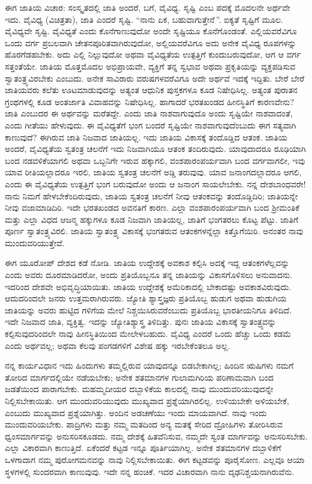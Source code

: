 ಈಗ ಜಾತಿಯ ವಿಚಾರ: ಸಂಸ್ಕೃತದಲ್ಲಿ ಜಾತಿ ಅಂದರೆ, ಬಗೆ, ವೈವಿಧ್ಯ. ಸೃಷ್ಟಿ ಎಂಬ ಪದಕ್ಕೆ ಮೊದಲನೇ ಅರ್ಥವೇ ಇದು. ವೈವಿಧ್ಯ (ವಿಚಿತ್ರತಾ), ಜಾತಿ ಎಂದರೆ ಸೃಷ್ಟಿ. “ನಾನು ಏಕ, ಬಹುವಾಗುತ್ತೇನೆ\,”. ಐಕ್ಯತೆ ಸೃಷ್ಟಿಗೆ ಮೂಲ. ವೈವಿಧ್ಯವೇ ಸೃಷ್ಟಿ. ವೈವಿಧ್ಯತೆ ಎಂದು ಕೊನೆಗಾಣುವುದೋ ಅಂದೇ ಸೃಷ್ಟಿಯೂ ಕೊನೆಗೊಂಡಂತೆ. ಎಲ್ಲಿಯವರೆವಿಗೂ ಒಂದು ವರ್ಗ  ಪ್ರಬಲವಾಗಿ ಚೇತನಪೂರಿತವಾಗಿರುವುದೋ, ಅಲ್ಲಿಯವರೆವಿಗೂ ಅದು ಅನೇಕ ವೈವಿಧ್ಯ ರೂಪಗಳನ್ನು ಹೊರಗೆಡಹಬೇಕು. ಅದು ಎಲ್ಲಿ ನಿಲ್ಲುವುದೋ ಅಥವಾ ವೈವಿಧ್ಯತೆಯ ಉತ್ಪತ್ತಿಗೆ ಕುಂದುಬರುವುದೋ, ಆಗ ಆ ವರ್ಗ ಸತ್ತಂತೆಯೇ. ಜಾತಿಯ ಮೊತ್ತಮೊದಲ ಅಭಿಪ್ರಾಯವೇ, ವ್ಯಕ್ತಿಗೆ ತನ್ನ ಸ್ವಭಾವ ಅಥವಾ ಪ್ರಕೃತಿಯನ್ನು ವ್ಯಕ್ತಪಡಿಸುವ ಸ್ವಾತಂತ್ರ್ಯವಿರಬೇಕು ಎಂಬುದು. ಅನೇಕ ಸಾವಿರಾರು ವರುಷಗಳವರೆವಿಗೂ ಅದೇ ಅರ್ಥವೆ ಇದಕ್ಕೆ ಇದ್ದಿತು. ಬೇರೆ ಬೇರೆ ಜಾತಿಯವರು ಕಲೆತು ಊಟಮಾಡುವುದನ್ನು ಅತ್ಯಂತ ಆಧುನಿಕ ಪುಸ್ತಕಗಳೂ ಕೂಡ ನಿಷೇಧಿಸಿಲ್ಲ. ಅತ್ಯಂತ ಪುರಾತನ ಗ್ರಂಥಗಳಲ್ಲಿ ಕೂಡ ಅಂತರ್ಜಾತಿ ವಿವಾಹವನ್ನು ನಿಷೇಧಿಸಿಲ್ಲ. ಹಾಗಾದರೆ ಭರತಖಂಡದ ಹೀನಸ್ಥಿತಿಗೆ ಕಾರಣವೇನು? ಜಾತಿ ಎಂಬುದರ ಈ ಅರ್ಥವನ್ನು ಮರೆತದ್ದೇ. ಎಂದು ಜಾತಿ ನಾಶವಾಗುವುದೊ ಅಂದು ಸೃಷ್ಟಿಯೇ ನಾಶವಾದಂತೆ, ಎಂದು ಗೀತೆಯು ಹೇಳುವುದು. ಈ ವೈವಿಧ್ಯತೆಗೆ ಭಂಗ ಬಂದರೆ ಸೃಷ್ಟಿಯೇ ನಾಶವಾಗುವುದೆಂಬುದು ಈಗ ಸತ್ಯವಾಗಿ ಕಾಣುವುದೆ? ಈಗಿರುವ ಜಾತಿ ನಿಜವಾದ ಜಾತಿಯಲ್ಲ. ಇದು ಜಾತಿಯ ವಿಕಾಸಕ್ಕೆ ತಂದೊಡ್ಡಿದ ಆತಂಕ. ಜಾತಿಯ ಅಂದರೆ, ವೈವಿಧ್ಯತೆಯ ಸ್ವತಂತ್ರ ಚಲನೆಗೆ ಇದು ನಿಜವಾಗಿಯೂ ಆತಂಕ ತಂದಿರುವುದು. ಯಾವುದಾದರೂ ರೂಢಿಯಾಗಿ ಬಂದ ನಡವಳಿಕೆಯಾಗಲಿ ಅಥವಾ ಒಬ್ಬನಿಗೇ ಇರುವ ಹಕ್ಕಾಗಲಿ, ವಂಶಪಾರಂಪರ್ಯವಾಗಿ ಬಂದ ವರ್ಗವಾಗಲೀ, ಇವು ಯಾವ ರೀತಿಯಲ್ಲಾದರೂ ಇರಲಿ, ಜಾತಿಯ ಸ್ವತಂತ್ರ ಚಲನೆಗೆ ಅಡ್ಡಿ ತರುವುವು. ಯಾವ ಜನಾಂಗದಲ್ಲಾದರೂ ಆಗಲಿ, ಎಂದು ಈ ವೈವಿಧ್ಯತೆಯ ಉತ್ಪತ್ತಿಗೆ ಭಂಗ ಬರುವುದೋ ಅಂದು ಆ ಜನಾಂಗ ಸಾಯಲೇಬೇಕು. ನನ್ನ ದೇಶಬಾಂಧವರೇ! ನಾನು ನಿಮಗೆ ಹೇಳಬೇಕೆಂದಿರುವುದು, ಜಾತಿಯ ಸ್ವತಂತ್ರ ಚಲನೆಗೆ ನೀವು ಆತಂಕವನ್ನು ತಂದೊಡ್ಡಿದಿರಿ; ಜಾತಿಯನ್ನೇ ನೀವು ವಜಾಮಾಡಿದಿರಿ. ಇದೇ ಭರತಖಂಡದ ಅವನತಿಗೆ ಕಾರಣ. ಎಲ್ಲಾ ವಂಶಪಾರಂಪರ್ಯವಾಗಿ ಬಂದ ಶ‍್ರೀಮಂತಿಕೆ ಮತ್ತು ಎಲ್ಲಾ ವಿಧದ ಆಜನ್ಮ ಹಕ್ಕುಗಳೂ ಕೂಡ ನಿಜವಾಗಿ ಜಾತಿಯಲ್ಲ, ಜಾತಿಗೆ ಭಂಗತರಲು ಕೊಟ್ಟ ಪೆಟ್ಟು. ಜಾತಿಗೆ ಪೂರ್ಣ ಸ್ವಾತಂತ್ರ್ಯವಿರಲಿ. ಜಾತಿಯ ಸ್ವಾತಂತ್ರ್ಯ ವಿಕಾಸಕ್ಕೆ ಭಂಗತರುವ ಆತಂಕಗಳನ್ನೆಲ್ಲಾ ಕಿತ್ತೊಗೆಯಿರಿ. ಅನಂತರ ನಾವು ಮುಂದುವರಿಯುತ್ತೇವೆ.

ಈಗ ಯೂರೋಪ್ ದೇಶದ ಕಡೆ ನೋಡಿ. ಜಾತಿಯ ಉದ್ದೇಶಕ್ಕೆ ಅವಕಾಶ ಕಲ್ಪಿಸಿ ಅದಕ್ಕೆ ಇದ್ದ ಆತಂಕಗಳೆಲ್ಲವನ್ನು ಎಂದು ಅವರು ದೂರಮಾಡಿದರೋ, ಅಂದು ಪ್ರತಿಯೊಬ್ಬನೂ ತನ್ನ ಜಾತಿಯನ್ನು ವಿಕಾಸಗೊಳಿಸಲು ಅನುವಾದನು. ಇದರಿಂದ ದೇಶವೇ ಅಭಿವೃದ್ಧಿಯಾಯಿತು. ಜಾತಿಯ ಉದ್ದೇಶಕ್ಕೆ ಅಮೆರಿಕಾದಲ್ಲಿ ಬೇಕಾದಷ್ಟು ಅವಕಾಶವಿರುವುದು. ಆದುದರಿಂದಲೇ ಜನರು ಉತ್ತಮರಾಗಿರುವರು. ಜ್ಯೋತಿ ಶ್ಯಾಸ್ತ್ರಜ್ಞರು ಪ್ರತಿಯೊಬ್ಬ ಹುಡುಗ ಅಥವಾ ಹುಡುಗಿಯ ಜಾತಿಯನ್ನು ಅವರು ಹುಟ್ಟಿದ ಗಳಿಗೆಯ ಮೇಲೆ ನಿಶ್ಚಯಿಸಿರುವರೆಂಬುದು ಪ್ರತಿಯೊಬ್ಬ ಭಾರತೀಯನಿಗೂ ತಿಳಿದಿದೆ. ಇದೇ ನಿಜವಾದ ಜಾತಿ, ವ್ಯಕ್ತಿತ್ವ. ಇದನ್ನು ಜ್ಯೋತಿಶ್ಯಾಸ್ತ್ರ ತಿಳಿದಿತ್ತು. ಪುನಃ ಜಾತಿಯ ವಿಕಾಸಕ್ಕೆ ಸ್ವಾತಂತ್ರ್ಯವನ್ನು ಕಲ್ಪಿಸುವುದರಿಂದಲೇ ನಾವು ಹೀನಸ್ಥಿತಿಯಿಂದ ಮೇಲೇಳಬಹುದು. ವೈವಿಧ್ಯ ಎಂದರೆ ಒಂದು ಹೆಚ್ಚು ಒಂದು ಕಡಮೆ ಎಂದು ಅರ್ಥವಲ್ಲ; ಅಥವಾ ಕೆಲವು ಪಂಗಡಗಳಿಗೆ ವಿಶೇಷ ಹಕ್ಕು ಇರಬೇಕೆಂತಲೂ ಅಲ್ಲ.

ನನ್ನ ಕಾರ್ಯವಿಧಾನ ಇದು\enginline{-} ಹಿಂದುಗಳು ತಮ್ಮಲ್ಲಿರುವ ಯಾವುದನ್ನೂ ಬಿಡಬೇಕಾಗಿಲ್ಲ; ಹಿಂದಿನ ಋಷಿಗಳು ನಮಗೆ ತೋರಿದ ಮಾರ್ಗದಲ್ಲಿಯೇ ನಡೆಯಬೇಕು; ಅನೇಕ ಶತಮಾನಗಳ ಗುಲಾಮಗಿರಿಯ ಪರಿಣಾಮವಾಗಿ ಬಂದ ಜಡತೆಯಿಂದ ಪಾರಾಗಬೇಕು. ಮಹಮ್ಮದೀಯರ ದಬ್ಬಾಳಿಕೆಯ ಕಾಲದಲ್ಲಿ ನಾವು ಮುಂದುವರಿಯುವುದನ್ನೇ ನಿಲ್ಲಿಸಬೇಕಾಯಿತು. ಆಗ ಮುಂದುವರಿಯುವುದು ಮುಖ್ಯವಾದ ಪ್ರಶ್ನೆಯಾಗಿರಲಿಲ್ಲ. ಉಳಿಯಬೇಕೇ ಅಳಿಯಬೇಕೆ, ಎಂಬುದು ಮುಖ್ಯವಾದ ಪ್ರಶ್ನೆಯಾಗಿತ್ತು. ಅಂದಿನ ಅಡಚಣೆಯು ಇಂದು ಮಾಯವಾಗಿದೆ. ನಾವು ಇಂದು ಮುಂದುವರಿಯಬೇಕು. ಪಾದ್ರಿಗಳು ಮತ್ತು ನಮ್ಮ ಮತದಿಂದ ಅನ್ಯ ಮತಕ್ಕೆ ಸೇರಿದ ದ್ರೋಹಿಗಳು ತೋರಿಸಿರುವ ಧ್ವಂಸಮಾರ್ಗವನ್ನು ಅನುಸರಿಸಕೂಡದು. ನಮ್ಮ ದೇಶಕ್ಕೆ ಹಿತವೆನಿಸುವ, ನಮ್ಮದೇ ಸ್ವಂತ ಮಾರ್ಗವನ್ನು ಅನುಸರಿಸಬೇಕು. ಎಲ್ಲಾ ವಿಕಾರವಾಗಿ ಕಾಣುತ್ತಿದೆ. ಏಕೆಂದರೆ ಕಟ್ಟಡ ಇನ್ನೂ ಪೂರ್ತಿಯಾಗಿಲ್ಲ. ಅನೇಕ ಶತಮಾನಗಳ ದಬ್ಬಾಳಿಕೆಗೆ ಒಳಗಾದಾಗ ನಮ್ಮ ಪುರೋಗಮನವನ್ನು ನಾವು ನಿಲ್ಲಿಸಬೇಕಾಯಿತು. ಈಗ ಕಟ್ಟಡವನ್ನು ಪೂರೈಸೋಣ. ಎಲ್ಲವೂ ಆಯಾ ಸ್ಥಳಗಳಲ್ಲಿ ಸುಂದರವಾಗಿ ಕಾಣುವುವು. ಇದೇ ನನ್ನ ಹಂಚಿಕೆ. ಇದರ ವಿಚಾರವಾಗಿ ನಾನು ದೃಢನಿಶ್ಚಯನಾಗಿರುವೆನು.

